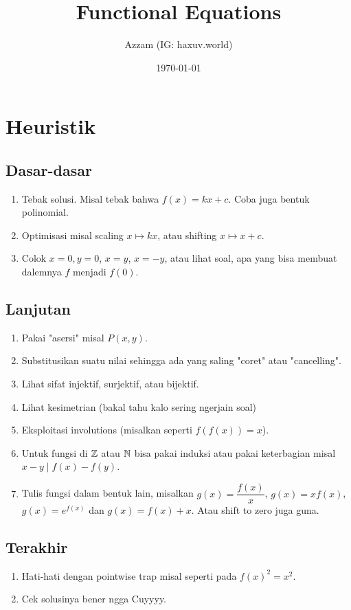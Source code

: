 \documentclass[12pt]{scrartcl}
\title{Functional Equations}
\author{Azzam (IG: haxuv.world)}
\date{\today}
\begin{document}
\maketitle

\renewcommand*\contentsname{Daftar Isi}
\tableofcontents

\newpage

\section{Heuristik}
\subsection{Dasar-dasar}
\begin{enumerate}
    \item Tebak solusi. Misal tebak bahwa $f(x)=kx+c$. Coba juga bentuk polinomial.
    \item Optimisasi misal scaling $x \mapsto kx$, atau shifting $x \mapsto x + c$.
    \item Colok $x=0, y=0$, $x=y$, $x=-y$, atau lihat soal, apa yang bisa membuat dalemnya $f$ menjadi $f(0)$.
\end{enumerate}

\subsection{Lanjutan}
\begin{enumerate}
    \item Pakai "asersi" misal $P(x,y)$.
    \item Substitusikan suatu nilai sehingga ada yang saling "coret" atau "cancelling".
    \item Lihat sifat injektif, surjektif, atau bijektif.
    \item Lihat kesimetrian (bakal tahu kalo sering ngerjain soal)
    \item Eksploitasi involutions (misalkan seperti $f(f(x))=x$).
    \item Untuk fungsi di $\mathbb Z$ atau $\mathbb N$ bisa pakai induksi atau pakai keterbagian misal $x-y \mid f(x)-f(y)$.
    \item Tulis fungsi dalam bentuk lain, misalkan $g(x)=\dfrac{f(x)}{x}$, $g(x)=xf(x)$, $g(x)=e^{f(x)}$ dan $g(x)=f(x)+x$. Atau shift to zero juga guna.
\end{enumerate}

\subsection{Terakhir}
\begin{enumerate}
    \item Hati-hati dengan pointwise trap misal seperti pada $f(x)^2=x^2$.
    \item Cek solusinya bener ngga Cuyyyy.
\end{enumerate}
\end{document}
